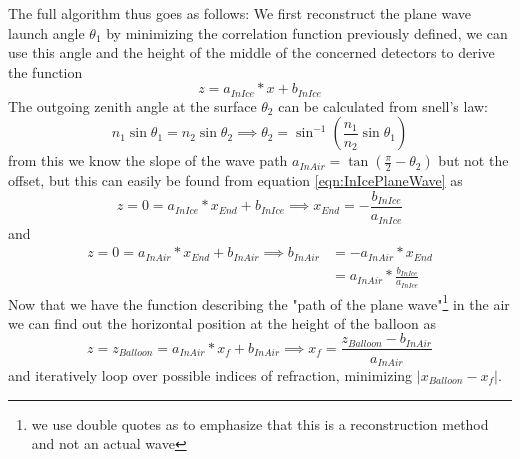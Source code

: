 \documentclass[11pt,a4paper,faculty=we,language=en,doctype=report]{cls/ugent-doc}
\begin{document}
The full algorithm thus goes as follows: We first reconstruct the
plane wave launch angle $\theta_1$ by minimizing the correlation function
previously defined, we can use this angle and the height of the middle of the
concerned detectors to derive the function
\begin{equation}
	z = a_{InIce}*x + b_{InIce}
	\label{eqn:InIcePlaneWave}
\end{equation}
The outgoing zenith angle at the surface $\theta_2$ can be calculated from snell's law:
\begin{equation}
n_1 \sin{\theta_1} = n_2 \sin{\theta_2} \implies  \theta_2 = \sin^{-1}\left(\frac{n_1}{n_2}\sin{\theta_1}\right)
\end{equation}
from this we know the slope of the wave path $a_{InAir} = \tan\left({\frac{\pi}{2} -
\theta_2}\right)$ but not the offset, but this can easily be found from equation
\ref{eqn:InIcePlaneWave} as 
\begin{equation}
	z = 0 = a_{InIce}*x_{End} + b_{InIce} \implies x_{End} = -\frac{b_{InIce}}{a_{InIce}}
\end{equation}
and 
\begin{align}
	z = 0 = a_{InAir}*x_{End} + b_{InAir} \implies b_{InAir} &= -a_{InAir}*x_{End}
	\\&= a_{InAir}* \frac{b_{InIce}}{a_{InIce}}
\end{align}
Now that we have the function describing the "path of the plane wave"\footnote{we use double
quotes as to emphasize that this is a reconstruction method and not an actual wave} in the air 
we can find out the horizontal position at the height of the balloon as
\begin{equation}
	z = z_{Balloon} = a_{InAir}*x_{f} + b_{InAir} \implies x_f = \frac{z_{Balloon} - b_{InAir}}{a_{InAir}}
\end{equation}
and iteratively loop over possible indices of refraction, minimizing $|x_{Balloon} - x_f|$.
\end{document}
